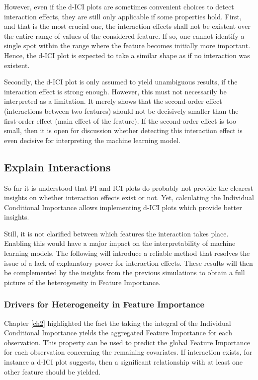 \documentclass[]{krantz}
\begin{document}
However, even if the d-ICI plots are sometimes convenient choices to
detect interaction effects, they are still only applicable if some
properties hold. First, and that is the most crucial one, the
interaction effects shall not be existent over the entire range of
values of the considered feature. If so, one cannot identify a single
spot within the range where the feature becomes initially more
important. Hence, the d-ICI plot is expected to take a similar shape as
if no interaction was existent.

Secondly, the d-ICI plot is only assumed to yield unambiguous results,
if the interaction effect is strong enough. However, this must not
necessarily be interpreted as a limitation. It merely shows that the
second-order effect (interactions between two features) should not be
decisively smaller than the first-order effect (main effect of the
feature). If the second-order effect is too small, then it is open for
discussion whether detecting this interaction effect is even decisive
for interpreting the machine learning model.

\pagebreak

\subsection{Explain Interactions}\label{ch32}

So far it is understood that PI and ICI plots do probably not provide
the clearest insights on whether interaction effects exist or not. Yet,
calculating the Individual Conditional Importance allows implementing
d-ICI plots which provide better insights.

Still, it is not clarified between which features the interaction takes
place. Enabling this would have a major impact on the interpretability
of machine learning models. The following will introduce a reliable
method that resolves the issue of a lack of explanatory power for
interaction effects. These results will then be complemented by the
insights from the previous simulations to obtain a full picture of the
heterogeneity in Feature Importance.

\subsubsection{Drivers for Heterogeneity in Feature
Importance}\label{ch321}

Chapter \ref{ch2} highlighted the fact the taking the integral of the
Individual Conditional Importance yields the aggregated Feature
Importance for each observation. This property can be used to predict
the global Feature Importance for each observation concerning the
remaining covariates. If interaction exists, for instance a d-ICI plot
suggests, then a significant relationship with at least one other
feature should be yielded.
\end{document}
